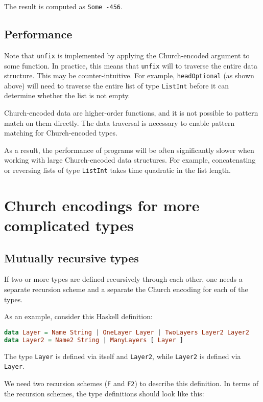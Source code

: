 The result is computed as \lstinline!Some -456!.


\subsection{Performance}


Note that \lstinline!unfix! is implemented by applying the Church-encoded argument to some function.
In practice, this means that \lstinline!unfix! will to traverse the entire data structure.
This may be counter-intuitive.
For example, \lstinline!headOptional! (as shown above) will need to traverse the entire list of type \lstinline!ListInt! before
it can determine whether the list is not empty.


Church-encoded data are higher-order functions, and it is not possible to pattern match on them directly.
The data traversal is necessary to enable pattern matching for Church-encoded types.


As a result, the performance of programs will be often significantly slower when working with large Church-encoded data structures.
For example, concatenating or reversing lists of type \lstinline!ListInt! takes time quadratic in the list length.


\section{Church encodings for more complicated types}


\subsection{Mutually recursive types}


If two or more types are defined recursively through each other, one needs a separate recursion scheme and a separate the Church encoding for each of the types.


As an example, consider this Haskell definition:


\begin{lstlisting}[language=Haskell]
data Layer = Name String | OneLayer Layer | TwoLayers Layer2 Layer2
data Layer2 = Name2 String | ManyLayers [ Layer ]   
\end{lstlisting}


The type \lstinline!Layer! is defined via itself and \lstinline!Layer2!, while \lstinline!Layer2! is defined via \lstinline!Layer!.


We need two recursion schemes (\lstinline!F! and \lstinline!F2!) to describe this definition. In terms of the recursion schemes, the type definitions should look like this:


